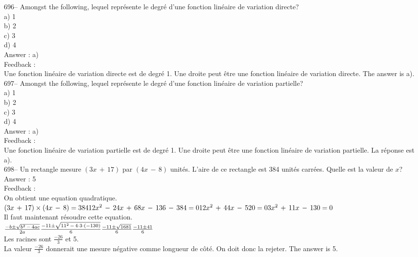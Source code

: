 \documentclass[letterpaper, 12pt]{article}
\begin{document}
696-- Amongst the following, lequel repr\'esente le degr\'e d'une
fonction lin\'eaire de variation directe?\\
a) 1\\
b) 2\\
c) 3\\
d) 4\\

Answer : a)\\

Feedback : \\
Une fonction lin\'eaire de variation directe est de degr\'e 1.  Une droite
peut \^etre une fonction lin\'eaire de variation directe.  The answer is
a).\\

697-- Amongst the following, lequel repr\'esente le degr\'e d'une
fonction lin\'eaire de variation partielle?\\
a) 1\\
b) 2\\
c) 3\\
d) 4\\

Answer : a)\\

Feedback : \\
Une fonction lin\'eaire de variation partielle est de degr\'e 1.  Une droite
peut \^etre une fonction lin\'eaire de variation partielle.  La r\'eponse
est a).\\

698-- Un rectangle mesure $(3x\,+\,17)$ par $(4x\,-\,8)$ unit\'es.  L'aire
de ce rectangle est 384 unit\'es carr\'ees.  Quelle est la valeur de $x$?\\

Answer : 5\\

Feedback : \\
On obtient une equation quadratique.  \\
$(3x\,+\,17)\times(4x\,-\,8)=384\\
12x^{2}\,-\,24x\,+\,68x\,-\,136\,-\,384=0\\
12x^{2}\,+\,44x\,-\,520=0\\
3x^{2}\,+\,11x\,-\,130=0$\\
Il faut maintenant r\'esoudre cette equation.\\[2mm]
$\frac{-b\pm\sqrt{b^{2}\,-\,4ac}}{2a}\\[2mm]
\frac{-11\pm \sqrt{11^{2}\,-\,4\cdot3\cdot(-130)}}{6}\\[2mm]
\frac{-11\pm \sqrt{1681}}{6}\\[2mm]
\frac{-11\pm 41}{6}$\\[2mm]
Les racines sont $\frac{-26}{3}$ et 5.\\[2mm]
La valeur $\frac{-26}{3}$ donnerait une mesure n\'egative comme longueur de
c\^ot\'e. On doit donc la rejeter.  The answer is 5.\\
\end{document}
